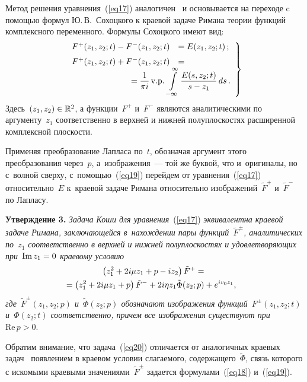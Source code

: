 \begin{multicols}{2}
Метод решения уравнения~(\ref{eq17}) аналогичен~\cite{ref14} и основывается на переходе c помощью формул Ю.\,В.~Сохоцкого к краевой задаче Римана теории функций комплексного переменного. Формулы Сохоцкого имеют вид:
\begin{equation}
\left.
  \begin{array}{rl}
F^+(z_1, z_2; t) - F^-(z_1, z_2; t) &= E(z_1, z_2; t)\,;\\[6pt]
  F^+(z_1, z_2; t) + F^-(z_1, z_2; t) &={}\\
   &\hspace*{-21mm}{}=\displaystyle\fr{1}{\pi i}\, \mathrm{v.p.}\,\displaystyle\int \limits_{-\infty}^{\infty} \fr{E(s, z_2; t)}{s-z_1}\, ds\,.
  \end{array}
  \right\}
    \label{eq19}
\end{equation}
Здесь~$(z_1, z_2) \hm\in \mathbb{R}^2$, а функции~$F^+$ и~$F^-$ являются аналитическими по аргументу~$z_1$ соответственно в верхней и нижней полуплоскостях расширенной комплексной плоскости.

Применяя преобразование Лапласа по~$t$, обозначая аргумент этого преобразования через~$p$, а~изоб\-ра\-же\-ния~--- той же буквой, что и~оригиналы, но с~волной сверху, с~по\-мощью~(\ref{eq19}) перейдем от уравнения~(\ref{eq17}) относительно~$E$ к~краевой задаче Римана относительно
изображений~$\tilde{F}^+$ и~$\tilde{F}^-$ по Лапласу.


\smallskip

\noindent
\textbf{Утверждение 3.}
\textit{Задача Коши для уравнения}~(\ref{eq17}) \textit{эквивалентна краевой задаче Римана, заключающейся в~нахождении пары функций~$\tilde F^\pm$, аналитических по~$z_1$ соответственно в верхней и нижней полуплоскостях и удовлетворяющих при~$\mathrm{Im}\, z_1 \hm= 0$ краевому условию}
  \begin{multline}
    \left(z_1^2 +2i \mu  z_1 + p - i z_2\right) \tilde F^+ = {}\\
    \hspace*{-5mm}{}=\left(z_1^2 +2i \mu  z_1 + p\right) \tilde F^- +
    2 i \eta z_1 \tilde \Phi(z_2;p) + e^{i v_0 z_1},\!\!
        \label{eq20}
  \end{multline}
 \textit{где~$\tilde F^\pm(z_1, z_2; p)$ и~$\tilde \Phi(z_2; p)$ обозначают изображения функций~$F^\pm(z_1, z_2; t)$ и~$\Phi(z_2; t)$ соответственно, причем все изображения существуют при}~$\mathrm{Re}\,{p} > 0$.

 \smallskip


Обратим внимание, что задача~(\ref{eq20}) отличается от аналогичных краевых задач~\cite{ref14,ref15,ref15a,ref17} появлением в краевом условии слагаемого, содержащего~$\tilde \Phi$, связь которого с искомыми краевыми значениями~$\tilde F^\pm$ задается формулами~(\ref{eq18}) и~(\ref{eq19}).


\end{multicols}
